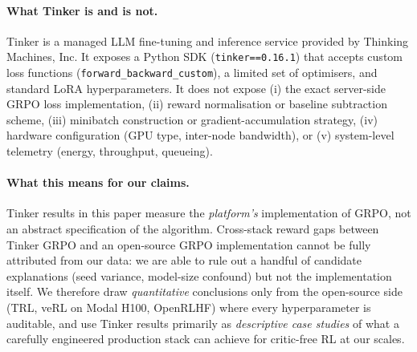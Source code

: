 \documentclass{article}
\begin{document}
\paragraph{What Tinker is and is not.}
Tinker \cite{thinkingmachines2024tinker} is a managed LLM fine-tuning and
inference service provided by Thinking Machines, Inc. It exposes a Python
SDK (\texttt{tinker==0.16.1}) that accepts custom loss functions
(\texttt{forward\_backward\_custom}), a limited set of optimisers, and
standard LoRA hyperparameters. It does not expose (i) the exact server-side
GRPO loss implementation, (ii) reward normalisation or baseline subtraction
scheme, (iii) minibatch construction or gradient-accumulation strategy,
(iv) hardware configuration (GPU type, inter-node bandwidth), or (v)
system-level telemetry (energy, throughput, queueing).

\paragraph{What this means for our claims.}
Tinker results in this paper measure the \emph{platform's} implementation
of GRPO, not an abstract specification of the algorithm. Cross-stack reward
gaps between Tinker GRPO and an open-source GRPO implementation cannot be
fully attributed from our data: we are able to rule out a handful of
candidate explanations (seed variance, model-size confound) but not the
implementation itself. We therefore draw \emph{quantitative} conclusions only
from the open-source side (TRL, veRL on Modal H100, OpenRLHF) where every
hyperparameter is auditable, and use Tinker results primarily as
\emph{descriptive case studies} of what a carefully engineered production
stack can achieve for critic-free RL at our scales.
\end{document}
